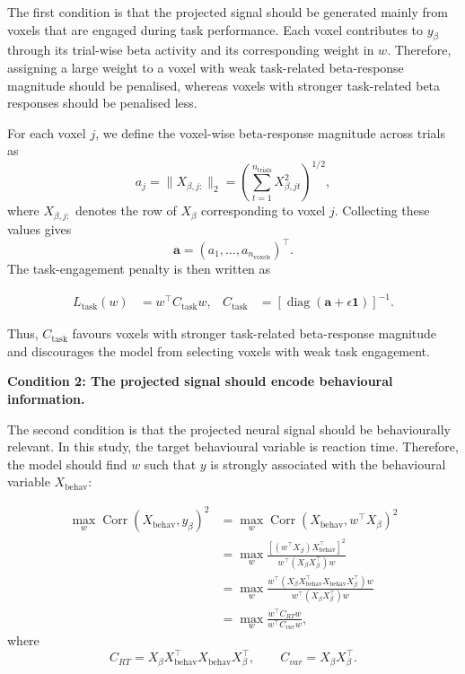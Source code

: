 \documentclass[utf8]{frontiers_suppmat}
\begin{document}
The first condition is that the projected signal should be generated mainly from voxels that are engaged during task performance. Each voxel contributes to \(y_{\beta}\) through its trial-wise beta activity and its corresponding weight in \(w\). Therefore, assigning a large weight to a voxel with weak task-related beta-response magnitude should be penalised, whereas voxels with stronger task-related beta responses should be penalised less.

For each voxel \(j\), we define the voxel-wise beta-response magnitude across trials as
\[
a_j = \|X_{\beta,j:}\|_2
=
\left(\sum_{t=1}^{n_{\mathrm{trials}}} X_{\beta,jt}^{2}\right)^{1/2},
\]
where \(X_{\beta,j:}\) denotes the row of \(X_\beta\) corresponding to voxel
\(j\). Collecting these values gives
\[
\mathbf{a} = (a_1,\ldots,a_{n_{\mathrm{voxels}}})^\top .
\]
The task-engagement penalty is then written as

\begin{equation*}
\begin{aligned}
L_{\mathrm{task}}(w)
&= w^\top C_{\mathrm{task}}w,
&
C_{\mathrm{task}}
&=
\left[\operatorname{diag}(\mathbf{a}+\epsilon\mathbf{1})\right]^{-1}.
\end{aligned}
\end{equation*}

Thus, \(C_{\mathrm{task}}\) favours voxels with stronger task-related
beta-response magnitude and discourages the model from selecting voxels with
weak task engagement.

\textbf{Condition 2: The projected signal should encode behavioural information.}

The second condition is that the projected neural signal should be behaviourally relevant. In this study, the target behavioural variable is reaction time. Therefore, the model should find $w$ such that $y$ is strongly associated with the behavioural variable $X_{\mathrm{behav}}$:

\begin{align*}
\max_w \operatorname{Corr}\!\left(X_{\mathrm{behav}}, y_{\beta}\right)^2
&=
\max_w \operatorname{Corr}\!\left(X_{\mathrm{behav}}, w^\top X_{\beta}\right)^2
\\[4pt]
&=
\max_w
\frac{
\left[(w^\top X_{\beta})X_{\mathrm{behav}}^\top\right]^2
}{
w^\top (X_{\beta}X_{\beta}^\top)w
}
\\[4pt]
&=
\max_w
\frac{
w^\top\left(X_{\beta}X_{\mathrm{behav}}^\top X_{\mathrm{behav}}X_{\beta}^\top\right)w
}{
w^\top\left(X_{\beta}X_{\beta}^\top\right)w
}
\\[4pt]
&=
\max_w
\frac{w^\top C_{RT} w}{w^\top C_{var} w},
\end{align*}
where
\begin{equation*}
C_{RT} = X_{\beta}X_{\mathrm{behav}}^\top X_{\mathrm{behav}}X_{\beta}^\top,
\qquad
C_{var} = X_{\beta}X_{\beta}^\top.
\end{equation*}
\end{document}
